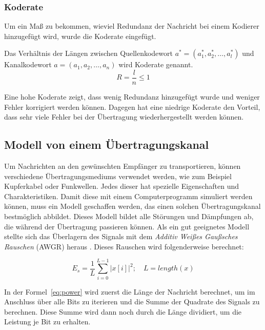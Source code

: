 \subsubsection{Koderate}
\label{sec:codeRate}
Um ein Maß zu bekommen, wieviel Redundanz der Nachricht bei einem Kodierer hinzugefügt wird, wurde die Koderate eingefügt.

\begin{t_def}
Das Verhältnis der Längen zwischen Quellenkodewort $a^*=(a^*_1,a^*_2,\dotsc,a^*_l)$ und Kanalkodewort $a=(a_1,a_2,\dotsc,a_n)$ wird Koderate genannt.
\begin{equation}
R = \frac{l}{n} \leq 1
\end{equation} 
\end{t_def} 

Eine hohe Koderate zeigt, dass wenig Redundanz hinzugefügt wurde und weniger Fehler korrigiert werden können. Dagegen hat eine niedrige Koderate den Vorteil, dass sehr viele Fehler bei der Übertragung wiederhergestellt werden können. \cite[136]{schoenfeld2012informations} 

\subsection{Modell von einem Übertragungskanal}
\label{sec:channels}
Um Nachrichten an den gewünschten Empfänger zu transportieren, können verschiedene Übertragungsmediums verwendet werden, wie zum Beispiel Kupferkabel oder Funkwellen. Jedes dieser hat spezielle Eigenschaften und Charakteristiken. Damit diese mit einem Computerprogramm simuliert werden können, muss ein Modell geschaffen werden, das einen solchen Übertragungskanal bestmöglich abbildet. Dieses Modell bildet alle Störungen und Dämpfungen ab, die während der Übertragung passieren können. Als ein gut geeignetes Modell stellte sich das Überlagern des Signals mit dem \emph{Additiv Weißes Gaußsches Rauschen} (AWGR) heraus \cite[81]{schoenfeld2012informations}. Dieses Rauschen wird folgenderweise berechnet:

\begin{equation}
E_s = \frac{1}{L} \displaystyle\sum_{i=0}^{L-1} |x[i]|^2; \quad L = length(x)
\label{eq:power}
\end{equation}

In der Formel~\ref{eq:power} wird zuerst die Länge der Nachricht berechnet, um im Anschluss über alle Bits zu iterieren und die Summe der Quadrate des Signals zu berechnen. Diese Summe wird dann noch durch die Länge dividiert, um die Leistung je Bit zu erhalten.

